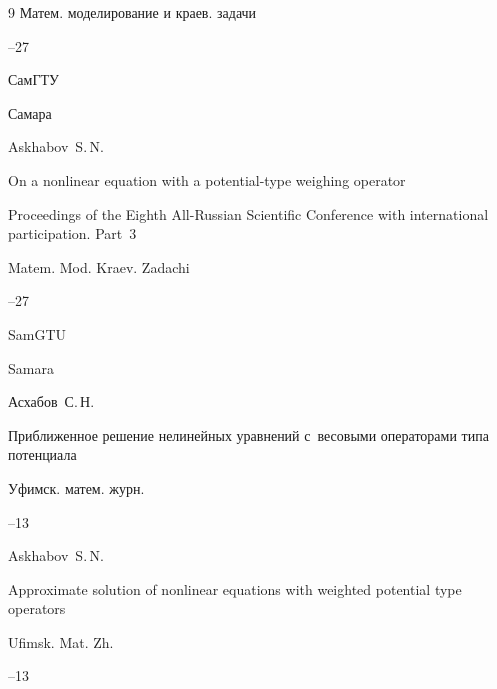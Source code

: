 \begin{thebibliography}{9}
\serial Матем. моделирование и краев. задачи


--27

\publ СамГТУ

\publaddr Самара

\misctransl 

\by Askhabov~S.\,N.

\paper On a nonlinear equation with a   potential-type weighing operator

\inbook Proceedings of the Eighth  All-Russian Scientific Conference with international participation. \rm Part~3

\serial Matem. Mod. Kraev. Zadachi


--27

\publ SamGTU

\publaddr Samara






\by Асхабов~С.\,Н.

\paper Приближенное решение нелинейных уравнений с~весовыми операторами типа потенциала

\jour Уфимск. матем. журн.




--13

\misctransl 

\by Askhabov~S.\,N.

\paper Approximate solution of nonlinear equations with weighted potential type operators

\jour Ufimsk. Mat. Zh.




--13



\end{thebibliography}





\noindent

\hskip6.5cm \thedate \par\noindent

\hskip6.5cm\therevdate



\vspace{-8mm}





\makeengtitle



\newpage



%

